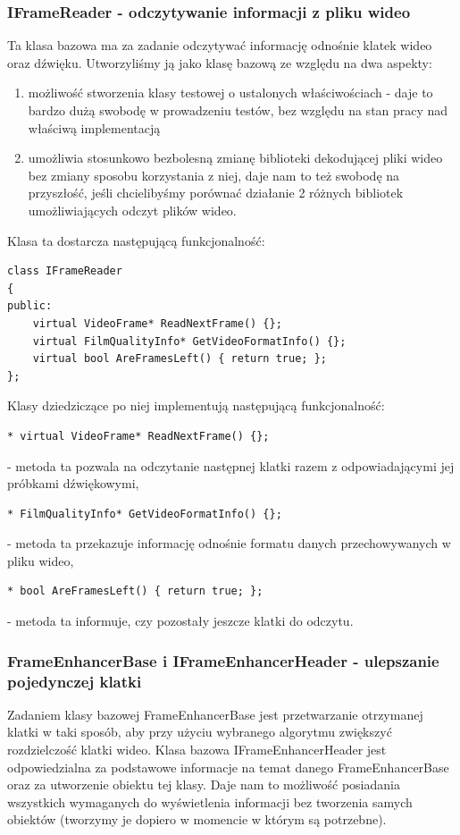 \documentclass[twoside]{projektInzynierskiMS}
\begin{document}
\subsubsection{IFrameReader - odczytywanie informacji z pliku wideo}
Ta klasa bazowa ma za zadanie odczytywać informację odnośnie klatek wideo oraz dźwięku. Utworzyliśmy ją jako klasę bazową ze względu na dwa aspekty:
\begin{enumerate}
\item możliwość stworzenia klasy testowej o ustalonych właściwościach - daje to bardzo dużą swobodę w prowadzeniu testów, bez względu na stan pracy nad właściwą implementacją
\item umożliwia stosunkowo bezbolesną zmianę biblioteki dekodującej pliki wideo bez zmiany sposobu korzystania z niej, daje nam to też swobodę na przyszłość, jeśli chcielibyśmy porównać działanie 2 różnych bibliotek umożliwiających odczyt plików wideo.
\end{enumerate}
Klasa ta dostarcza następującą funkcjonalność:
\begin{verbatim}
class IFrameReader
{
public:
    virtual VideoFrame* ReadNextFrame() {};
    virtual FilmQualityInfo* GetVideoFormatInfo() {};
    virtual bool AreFramesLeft() { return true; };
};
\end{verbatim}
Klasy dziedziczące po niej implementują następującą funkcjonalność:
\begin{verbatim}
* virtual VideoFrame* ReadNextFrame() {};
\end{verbatim}
- metoda ta pozwala na odczytanie następnej klatki razem z odpowiadającymi jej próbkami dźwiękowymi,
\begin{verbatim}
* FilmQualityInfo* GetVideoFormatInfo() {};
\end{verbatim}
- metoda ta przekazuje informację odnośnie formatu danych przechowywanych w pliku wideo,
\begin{verbatim}
* bool AreFramesLeft() { return true; };
\end{verbatim}
 - metoda ta informuje, czy pozostały jeszcze klatki do odczytu.

\subsubsection{FrameEnhancerBase i IFrameEnhancerHeader - ulepszanie pojedynczej klatki}
Zadaniem klasy bazowej FrameEnhancerBase jest przetwarzanie otrzymanej klatki w taki sposób, aby przy użyciu wybranego algorytmu zwiększyć rozdzielczość klatki wideo. Klasa bazowa IFrameEnhancerHeader jest odpowiedzialna za podstawowe informacje na temat danego FrameEnhancerBase oraz za utworzenie obiektu tej klasy. Daje nam to możliwość posiadania wszystkich wymaganych do wyświetlenia informacji bez tworzenia samych obiektów (tworzymy je dopiero w momencie w którym są potrzebne).
\end{document}
